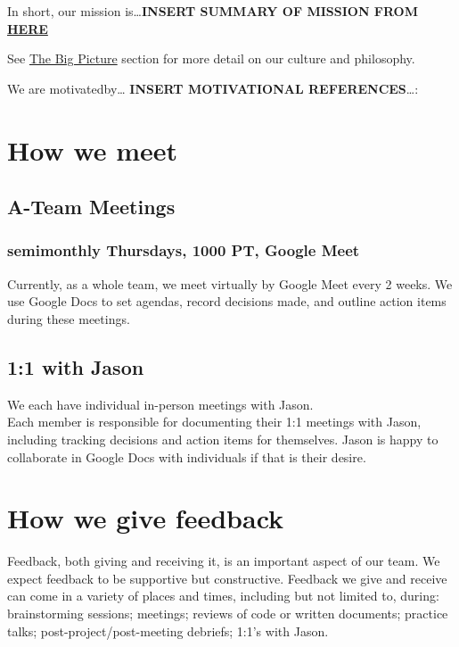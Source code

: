 \documentclass[
  letterpaper,
  DIV=11,
  numbers=noendperiod]{scrreprt}
\begin{document}
In short, our mission is\ldots{}\textbf{INSERT SUMMARY OF MISSION FROM
\protect\hyperlink{sec-big-picture}{HERE}}

See \protect\hyperlink{sec-big_picture}{The Big Picture} section for
more detail on our culture and philosophy.

We are motivatedby\ldots{} \textbf{INSERT MOTIVATIONAL
REFERENCES}\ldots:

\hypertarget{how-we-meet}{%
\section{How we meet}\label{how-we-meet}}

\hypertarget{a-team-meetings}{%
\subsection{A-Team Meetings}\label{a-team-meetings}}

\hypertarget{semimonthly-thursdays-1000-pt-google-meet}{%
\subsubsection{semimonthly Thursdays, 1000 PT, Google
Meet}\label{semimonthly-thursdays-1000-pt-google-meet}}

Currently, as a whole team, we meet virtually by Google Meet every 2
weeks. We use Google Docs to set agendas, record decisions made, and
outline action items during these meetings.

\hypertarget{with-jason}{%
\subsection{1:1 with Jason}\label{with-jason}}

We each have individual in-person meetings with Jason.\\
Each member is responsible for documenting their 1:1 meetings with
Jason, including tracking decisions and action items for themselves.
Jason is happy to collaborate in Google Docs with individuals if that is
their desire.

\hypertarget{how-we-give-feedback}{%
\section{How we give feedback}\label{how-we-give-feedback}}

Feedback, both giving and receiving it, is an important aspect of our
team. We expect feedback to be supportive but constructive. Feedback we
give and receive can come in a variety of places and times, including
but not limited to, during: brainstorming sessions; meetings; reviews of
code or written documents; practice talks; post-project/post-meeting
debriefs; 1:1's with Jason.
\end{document}
